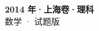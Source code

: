 \documentclass[zihao=-4, a4paper]{ctexart}
\begin{document}
\begin{center}
  {\Large\bfseries 2014 年·上海卷·理科}\\[4pt]
  {\large 数学 · 试题版}
\end{center}
\medskip
{}

\end{document}
